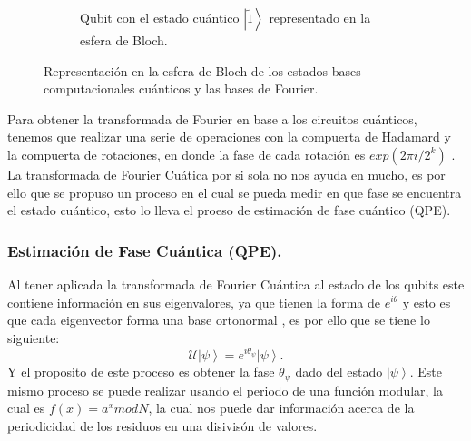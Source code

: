 \begin{figure}[H]
\begin{subfigure}{0.5\linewidth}
        \caption{Qubit con el estado cuántico $\left|\tilde{1} \right\rangle$ representado en la esfera de Bloch.}
    \end{subfigure}
\caption{Representación en la esfera de Bloch de los estados bases computacionales cuánticos y las bases de Fourier.}
\label{fig:QFT_bloch}
\end{figure}
Para obtener la transformada de Fourier en base a los circuitos cuánticos, tenemos que realizar una serie de operaciones con la compuerta de Hadamard y la compuerta de rotaciones, en donde la 
fase de cada rotación es $exp(2\pi i / 2^k)$ \cite{Vandersypen2001}. La transformada de Fourier Cuática por si sola no nos ayuda en mucho, es por ello que se propuso un proceso en el cual
se pueda medir en que fase se encuentra el estado cuántico, esto lo lleva el proeso de estimación de fase cuántico (QPE).
\subsubsection{Estimación de Fase Cuántica (QPE).}

Al tener aplicada la transformada de Fourier Cuántica al estado de los qubits este contiene información en sus eigenvalores, ya que tienen la forma de
$e^{i\theta}$ y esto es que cada eigenvector forma una base ortonormal \cite{Berman2000}, es por ello que se tiene lo siguiente:
\begin{equation*}
    \mathcal{U} \left|\psi \right\rangle = e^{i\theta_\psi}\left|\psi \right\rangle.
\end{equation*}
Y el proposito de este proceso es obtener la fase $\theta_\psi$ dado del estado $\left|\psi \right\rangle$. Este mismo proceso se puede realizar usando 
el periodo de una función modular, la cual es $f(x)=a^xmodN$, la cual nos puede dar información acerca de la periodicidad de los residuos en una disivisón de valores.
